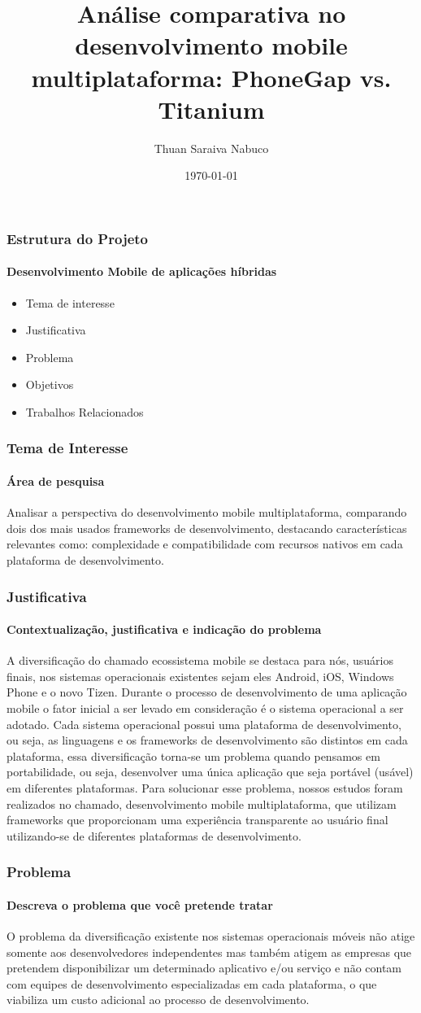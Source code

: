 \documentclass[10pt]{beamer}
\title{Análise comparativa no desenvolvimento mobile multiplataforma: PhoneGap vs. Titanium}
\author{Thuan Saraiva Nabuco}
\institute{Universidade Estadual do Ceará}
\date{\today}
\begin{document}
\titlepage
\begin{frame}
	\frametitle{Estrutura do Projeto}
	\framesubtitle{Desenvolvimento Mobile de aplicações híbridas}
	\begin{itemize}
		\item Tema de interesse
		\item Justificativa
		\item Problema
		\item Objetivos
		\item Trabalhos Relacionados
	\end{itemize}
\end{frame}

\begin{frame}
	\frametitle{Tema de Interesse}
	\framesubtitle{Área de pesquisa}
	Analisar a perspectiva do desenvolvimento mobile multiplataforma, comparando dois dos mais usados frameworks de desenvolvimento, destacando características relevantes como: complexidade e compatibilidade com recursos nativos em cada plataforma de desenvolvimento.
\end{frame}

\begin{frame}[t]
	\frametitle{Justificativa}
	\framesubtitle{Contextualização, justificativa e indicação do problema}
	 A diversificação do chamado ecossistema mobile se destaca para nós, usuários finais, nos sistemas operacionais existentes sejam eles Android, iOS, Windows Phone e o novo Tizen. Durante o processo de desenvolvimento de uma aplicação mobile o fator inicial a ser levado em consideração é o sistema operacional a ser adotado. Cada sistema operacional possui uma plataforma de desenvolvimento, ou seja, as linguagens e os frameworks de desenvolvimento são distintos em cada plataforma, essa diversificação torna-se um problema quando pensamos em portabilidade, ou seja, desenvolver uma única aplicação que seja portável (usável) em diferentes plataformas. Para solucionar esse problema, nossos estudos foram realizados no chamado, desenvolvimento mobile multiplataforma, que utilizam frameworks que proporcionam uma experiência transparente ao usuário final utilizando-se de diferentes plataformas de desenvolvimento. 
\end{frame}

\begin{frame}
	\frametitle{Problema}
	\framesubtitle{Descreva o problema que você pretende tratar}
	O problema da diversificação existente nos sistemas operacionais móveis não atige somente aos desenvolvedores independentes mas também atigem as empresas que pretendem disponibilizar um determinado aplicativo e/ou serviço e não contam com equipes de desenvolvimento especializadas em cada plataforma, o que viabiliza um custo adicional ao processo de desenvolvimento.
\end{frame}
\end{document}
